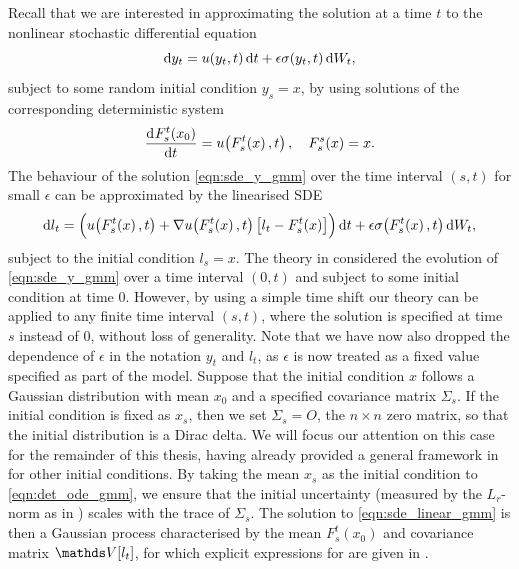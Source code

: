 Recall that we are interested in approximating the solution at a time \(t\) to the nonlinear stochastic differential equation
\begin{equation}
	\dif y_t = u\!\left(y_t, t\right)\dif t + \epsilon\sigma\!\left(y_t, t\right)\dif W_t,
	\label{eqn:sde_y_gmm}
\end{equation}
subject to some random initial condition \(y_s = x\), by using solutions of the corresponding deterministic system
\begin{equation}
	\dod{F_s^t\!\left(x_0\right)}{t} = u\!\left(F_s^t\!\left(x\right), t\right), \quad F_s^s\!\left(x\right) = x.
	\label{eqn:det_ode_gmm}
\end{equation}
The behaviour of the solution \cref{eqn:sde_y_gmm} over the time interval \((s,t)\) for small \(\epsilon\) can be approximated by the linearised SDE
\begin{equation}
	\dif l_t = \left(u\!\left(F_s^t\!\left(x\right), t\right) + \nabla u\!\left(F_s^t\!\left(x\right), t\right)\left[l_t - F_s^t\!\left(x\right)\right]\right)\dif t + \epsilon\sigma\!\left(F_s^t\!\left(x\right), t\right)\dif W_t,
	\label{eqn:sde_linear_gmm}
\end{equation}
subject to the initial condition \(l_s = x\).
The theory in  considered the evolution of \cref{eqn:sde_y_gmm} over a time interval \((0,t)\) and subject to some initial condition at time \(0\).
However, by using a simple time shift our theory can be applied to any finite time interval \((s,t)\), where the solution is specified at time \(s\) instead of \(0\), without loss of generality.
Note that we have now also dropped the dependence of \(\epsilon\) in the notation \(y_t\) and \(l_t\), as \(\epsilon\) is now treated as a fixed value specified as part of the model.
Suppose that the initial condition \(x\) follows a Gaussian distribution with mean \(x_0\) and a specified covariance matrix \(\Sigma_s\).
If the initial condition is fixed as \(x_s\), then we set \(\Sigma_s = O\), the \(n \times n\) zero matrix, so that the initial distribution is a Dirac delta.
We will focus our attention on this case for the remainder of this thesis, having already provided a general framework in  for other initial conditions.
By taking the mean \(x_s\) as the initial condition to \cref{eqn:det_ode_gmm}, we ensure that the initial uncertainty (measured by the \(L_r\)-norm as in ) scales with the trace of \(\Sigma_s\).
The solution to \cref{eqn:sde_linear_gmm} is then a Gaussian process characterised by the mean \(F_s^t\!\left(x_0\right)\) and covariance matrix \(\var{l_t}\), for which explicit expressions for are given in .

